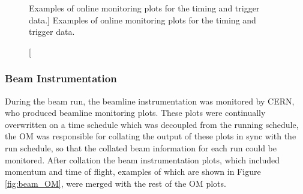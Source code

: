\begin{figure}
	\caption
	[Examples of online monitoring plots for the timing and trigger data.]
	{Examples of online monitoring plots for the timing and trigger data.}
	\label{fig:timing_OM}

\end{figure}

\subsubsection*{Beam Instrumentation}
During the \protodune{} beam run, the beamline instrumentation was monitored 
by CERN, who produced beamline monitoring plots\cite{Booth:2019brj}. These plots
were continually overwritten on a time schedule which was decoupled from the 
\protodune{} running schedule, the OM was responsible for collating the output 
of these plots in sync with the \protodune{} run schedule, so that the 
collated beam information for each run could be monitored. After collation the 
beam instrumentation plots, which included momentum and time of flight, examples
of which are shown in Figure \ref{fig:beam_OM}, were merged with the rest of 
the OM plots. 

